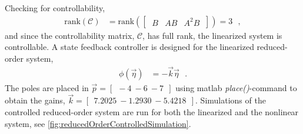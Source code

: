 %
Checking for controllability,
\begin{align}
  \mathrm{rank}(\mathcal{C}) &= \mathrm{rank}([\ \begin{matrix} B & AB & A^2 B \end{matrix}\ ]) = 3  \ \ \ ,
\end{align}
and since the controllability matrix, $\mathcal{C}$, has full rank, the linearized system is controllable.
%
A state feedback controller is designed for the linearized reduced-order system,
\begin{align}
\phi(\vec{\eta}) &=   - \vec{k} \vec{\eta}  \ \ \ .
\end{align}
%
The poles are placed in $\vec{p} = [\ \ -4 \ -6 \ -7\ \ ]$ using matlab \textit{place()}-command to obtain the gains, $\vec{k} =  [\ \ 7.2025 \ -1.2930 \ -5.4218 \ \ ]$. Simulations of the controlled reduced-order system are run for both the linearized and the nonlinear system, see \autoref{fig:reducedOrderControlledSimulation}.
%
